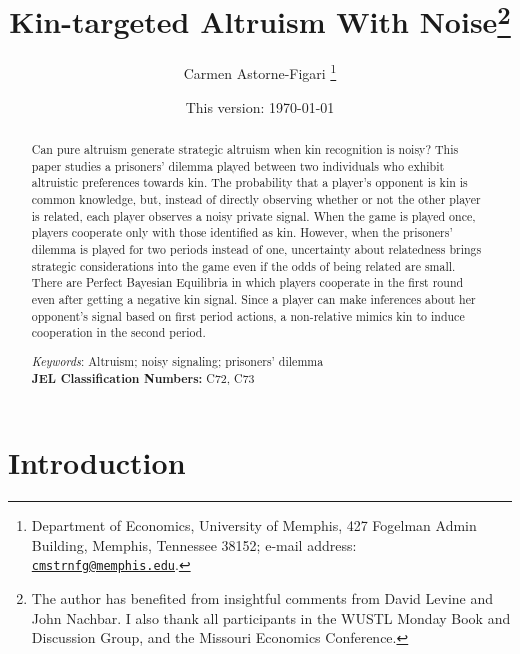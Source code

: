 \documentclass[12pt]{article}
\title{Kin-targeted Altruism With Noise\thanks{The author has benefited from insightful comments from David Levine and John Nachbar. I also thank all participants in the WUSTL Monday Book and Discussion Group, and the Missouri Economics Conference.}}
\author{Carmen Astorne-Figari \thanks{Department of Economics, University of Memphis, 427 Fogelman Admin Building, Memphis, Tennessee 38152;  e-mail address: \href{mailto:cmstrnfg@memphis.edu}{\tt cmstrnfg@memphis.edu}.}}
\date{This version: \today}
\begin{document}
\maketitle
\begin{abstract}
\thispagestyle{empty}
\bigskip
Can pure altruism generate strategic altruism when kin recognition is noisy? This paper studies a prisoners' dilemma played between two individuals who exhibit altruistic preferences towards kin. The probability that a player's opponent is kin is common knowledge, but, instead of directly observing whether or not the other player is related, each player observes a noisy private signal. When the game is played once, players cooperate only with those identified as kin. However, when the prisoners' dilemma is played for two periods instead of one, uncertainty about relatedness brings strategic considerations into the game even if the odds of being related are small. There are Perfect Bayesian Equilibria in which players cooperate in the first round even after getting a negative kin signal. Since a player can make inferences about her opponent's signal based on first period actions, a non-relative mimics kin to induce cooperation in the second period.
\\
\bigskip \bigskip

\noindent \textit{Keywords}: Altruism; noisy signaling; prisoners' dilemma\\

\noindent \textbf{JEL Classification Numbers:} C72, C73
\end{abstract}

\newpage
\setcounter{page}{1} \doublespacing \section{Introduction}
\end{document}
